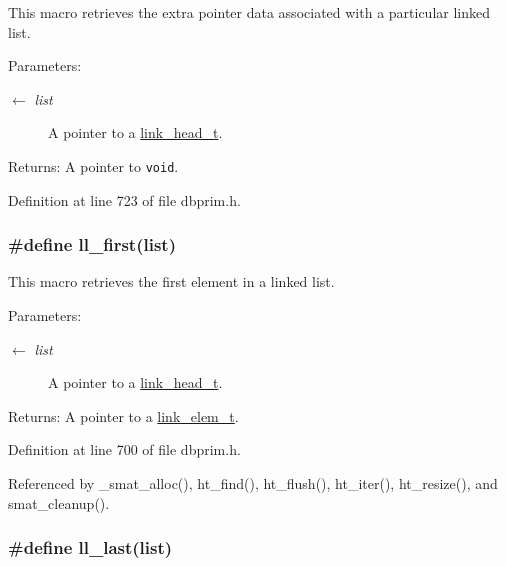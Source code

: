 This macro retrieves the extra pointer data associated with a particular linked list.

\begin{Desc}
\item[Parameters:]
\begin{description}
\item[\mbox{$\leftarrow$} {\em list}]A pointer to a \hyperlink{group__dbprim__link_ga0}{link\_\-head\_\-t}.\end{description}
\end{Desc}
\begin{Desc}
\item[Returns:]A pointer to {\tt void}.\end{Desc}


Definition at line 723 of file dbprim.h.\hypertarget{group__dbprim__link_ga17}{
\subsubsection[ll\_\-first]{\setlength{\rightskip}{0pt plus 5cm}\#define ll\_\-first(list)}}
\label{group__dbprim__link_ga17}


This macro retrieves the first element in a linked list.

\begin{Desc}
\item[Parameters:]
\begin{description}
\item[\mbox{$\leftarrow$} {\em list}]A pointer to a \hyperlink{group__dbprim__link_ga0}{link\_\-head\_\-t}.\end{description}
\end{Desc}
\begin{Desc}
\item[Returns:]A pointer to a \hyperlink{group__dbprim__link_ga1}{link\_\-elem\_\-t}.\end{Desc}


Definition at line 700 of file dbprim.h.

Referenced by \_\-smat\_\-alloc(), ht\_\-find(), ht\_\-flush(), ht\_\-iter(), ht\_\-resize(), and smat\_\-cleanup().\hypertarget{group__dbprim__link_ga18}{
\subsubsection[ll\_\-last]{\setlength{\rightskip}{0pt plus 5cm}\#define ll\_\-last(list)}}
\label{group__dbprim__link_ga18}


